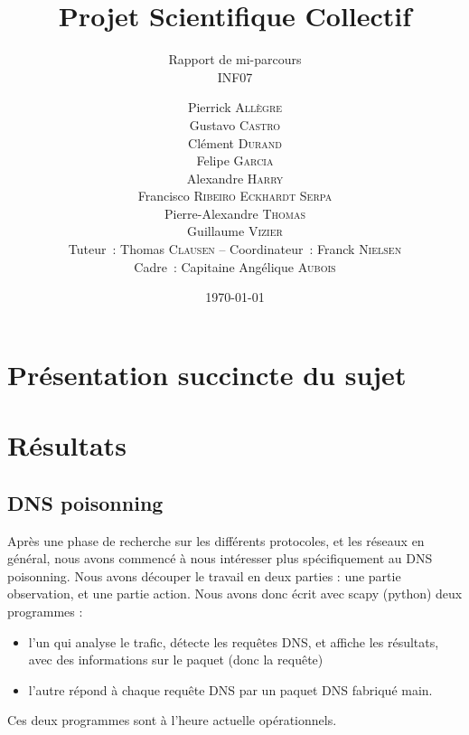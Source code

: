 \documentclass[a4paper, 12pt,twoside]{article}
\title{Projet Scientifique Collectif}
\author{Pierrick \textsc{Allègre} \\
		Gustavo \textsc{Castro} \\
		Clément \textsc{Durand} \\
		Felipe \textsc{Garcia} \\
		Alexandre \textsc{Harry} \\
		Francisco \textsc{Ribeiro Eckhardt Serpa} \\
		Pierre-Alexandre \textsc{Thomas} \\
		Guillaume \textsc{Vizier} \\
        Tuteur~: Thomas \textsc{Clausen} -- Coordinateur~: Franck \textsc{Nielsen} \\
        Cadre~: Capitaine Angélique \textsc{Aubois} \\}
\subtitle{Rapport de mi-parcours \\ INF07}
\date{\today}
\begin{document}
\maketitle
\renewcommand{\baselinestretch}{1.1}
\setlength{\parskip}{0.5em}
\tableofcontents
\clearpage

\section*{Présentation succincte du sujet}
	
\section{Résultats}
	\subsection{DNS poisonning}
	
	Après une phase de recherche sur les différents protocoles, et les réseaux en général, nous avons commencé à nous intéresser plus spécifiquement au DNS poisonning. Nous avons découper le travail en deux parties : une partie observation, et une partie action. Nous avons donc écrit avec scapy (python) deux programmes : \begin{itemize}[label=\color{bleu303}\textbullet{}]
	\item l'un qui analyse le trafic, détecte les requêtes DNS, et affiche les résultats, avec des informations sur le paquet (donc la requête)
	\item l'autre répond à chaque requête DNS par un paquet DNS fabriqué main.
\end{itemize}

	Ces deux programmes sont à l'heure actuelle opérationnels. 
	
\end{document}
